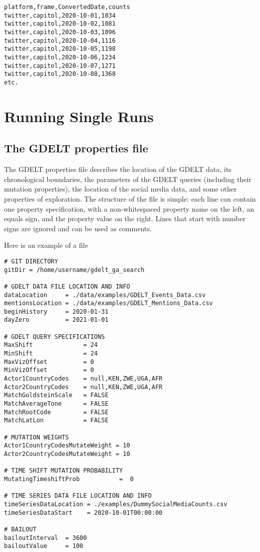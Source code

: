 \begin{verbatim}
platform,frame,ConvertedDate,counts
twitter,capitol,2020-10-01,1034
twitter,capitol,2020-10-02,1081
twitter,capitol,2020-10-03,1096
twitter,capitol,2020-10-04,1116
twitter,capitol,2020-10-05,1198
twitter,capitol,2020-10-06,1234
twitter,capitol,2020-10-07,1271
twitter,capitol,2020-10-08,1368
etc.
\end{verbatim}


\section{Running Single Runs}

\subsection{The GDELT properties file}\label{sec:GDELTPropertiesFile}

The GDELT properties file describes the location of the GDELT data, its chronological boundaries, the parameters of the GDELT queries (including their mutation properties), the location of the social media data, and some other properties of exploration. The structure of the file is simple: each line can contain one property specification, with a non-whitespaced property name on the left, an equals sign, and the property value on the right. Lines that start with number signs are ignored and can be used as comments.

Here is an example of a file

\begin{lstlisting}
# GIT DIRECTORY
gitDir = /home/username/gdelt_ga_search

# GDELT DATA FILE LOCATION AND INFO
dataLocation     = ./data/examples/GDELT_Events_Data.csv
mentionsLocation = ./data/examples/GDELT_Mentions_Data.csv
beginHistory     = 2020-01-31
dayZero          = 2021-01-01  

# GDELT QUERY SPECIFICATIONS
MaxShift              = 24
MinShift              = 24
MaxVizOffset          = 0
MinVizOffset          = 0
Actor1CountryCodes    = null,KEN,ZWE,UGA,AFR
Actor2CountryCodes    = null,KEN,ZWE,UGA,AFR
MatchGoldsteinScale   = FALSE
MatchAverageTone      = FALSE
MatchRootCode         = FALSE
MatchLatLon           = FALSE

# MUTATION WEIGHTS
Actor1CountryCodesMutateWeight = 10
Actor2CountryCodesMutateWeight = 10

# TIME SHIFT MUTATION PROBABILITY
MutatingTimeshiftProb           =  0

# TIME SERIES DATA FILE LOCATION AND INFO
timeSeriesDataLocation = ./examples/DummySocialMediaCounts.csv
timeSeriesDataStart    = 2020-10-01T00:00:00

# BAILOUT
bailoutInterval  = 3600
bailoutValue     = 100
\end{lstlisting}

